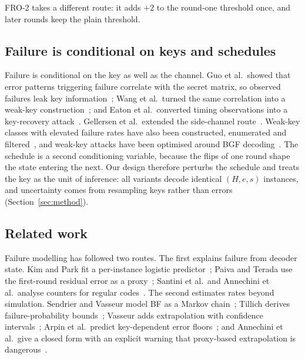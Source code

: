\documentclass[letterpaper,journal]{IEEEtran}
\begin{document}
FRO-2 takes a different route: it adds $+2$ to the round-one threshold once, and later rounds keep the plain threshold.

\subsection{Failure is conditional on keys and schedules}

Failure is conditional on the key as well as the channel. Guo et al.\ showed that error patterns triggering failure correlate with the secret matrix, so observed failures leak key information~\cite{guo2016key}; Wang et al.\ turned the same correlation into a weak-key construction~\cite{wang2023weak}; and Eaton et al.\ converted timing observations into a key-recovery attack~\cite{eaton2018timing}. Gellersen et al.\ extended the side-channel route~\cite{gellersen2025}. Weak-key classes with elevated failure rates have also been constructed, enumerated and filtered~\cite{vasseur2021thesis,nosouhi2023weakkey,matthews2025combinatorial}, and weak-key attacks have been optimised around BGF decoding~\cite{liu2025bgf}. The schedule is a second conditioning variable, because the flips of one round shape the state entering the next. Our design therefore perturbs the schedule and treats the key as the unit of inference: all variants decode identical $(H,e,s)$ instances, and uncertainty comes from resampling keys rather than errors (Section~\ref{sec:method}).

\subsection{Related work}

Failure modelling has followed two routes. The first explains failure from decoder state. Kim and Park fit a per-instance logistic predictor~\cite{kim2021logistic}; Paiva and Terada use the first-round residual error as a proxy~\cite{paiva2022pickyfix}; Santini et al.\ and Annechini et al.\ analyse counters for regular codes~\cite{santini2019conservative,santini2020analysis,annechini2024estimation}. The second estimates rates beyond simulation. Sendrier and Vasseur model BF as a Markov chain~\cite{sendrier2019dfr,sendrier2020lowdfr}; Tillich derives failure-probability bounds~\cite{tillich2018dfp}; Vasseur adds extrapolation with confidence intervals~\cite{vasseur2021thesis}; Arpin et al.\ predict key-dependent error floors~\cite{arpin2025errorfloor}; and Annechini et al.\ give a closed form with an explicit warning that proxy-based extrapolation is dangerous~\cite{annechini2025closedform}.
\end{document}
